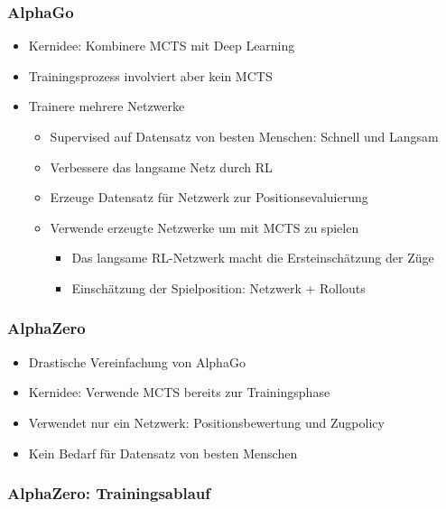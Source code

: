 \begin{frame}
 \frametitle{AlphaGo}
  


\begin{itemize}
  \item \pause Kernidee: Kombinere MCTS mit Deep Learning
  \item \pause Trainingsprozess involviert aber kein MCTS
  \item \pause Trainere mehrere Netzwerke
\begin{itemize}
  \item \pause Supervised auf Datensatz von besten Menschen: Schnell und Langsam
  \item \pause Verbessere das langsame Netz durch RL
  \item \pause Erzeuge Datensatz für Netzwerk zur Positionsevaluierung
  \item \pause Verwende erzeugte Netzwerke um mit MCTS zu spielen
\begin{itemize}
  \item \pause Das langsame RL-Netzwerk macht die Ersteinschätzung der Züge
  \item \pause Einschätzung der Spielposition: Netzwerk + Rollouts
\end{itemize}
\end{itemize}
\end{itemize}

  
\end{frame}
\begin{frame}
 \frametitle{AlphaZero}
  


\begin{itemize}
  \item \pause Drastische Vereinfachung von AlphaGo
  \item \pause Kernidee: Verwende MCTS bereits zur Trainingsphase
  \item \pause Verwendet nur ein Netzwerk: Positionsbewertung und Zugpolicy
  \item \pause Kein Bedarf für Datensatz von besten Menschen
\end{itemize}

  
\end{frame}
\begin{frame}
 \frametitle{AlphaZero: Trainingsablauf}
  


\begin{center}
\end{center}

  
\end{frame}

